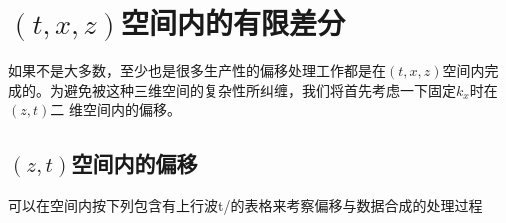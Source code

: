 \section{$(t, x, z)$空间内的有限差分}
\label{sec:2.7}

如果不是大多数，至少也是很多生产性的偏移处理工作都是在$(t,x,z)$空间内完
成的。为避免被这种三维空间的复杂性所纠缠，我们将首先考虑一下固定$k_x$时在$(z,t)$二
维空间内的偏移。

\subsection{$(z,t)$空间内的偏移}
\label{sec:2.7.1}

可以在空间内按下列包含有上行波t/的表格来考察偏移与数据合成的处理过程

